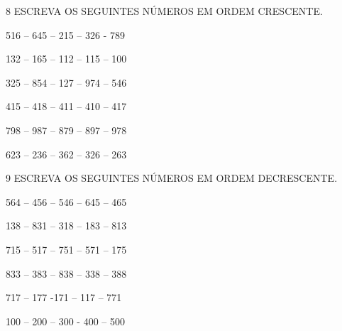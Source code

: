 
\num{8} ESCREVA OS SEGUINTES NÚMEROS EM ORDEM CRESCENTE.

\begin{escolha}
\item 516 -- 645 -- 215 -- 326 - 789



\item 132 -- 165 -- 112 -- 115 -- 100



\item 325 -- 854 -- 127 -- 974 -- 546



\item 415 -- 418 -- 411 -- 410 -- 417



\item 798 -- 987 -- 879 -- 897 -- 978



\item 623 -- 236 -- 362 -- 326 -- 263

\end{escolha}

\pagebreak
\num{9} ESCREVA OS SEGUINTES NÚMEROS EM ORDEM DECRESCENTE.

\begin{escolha}
\item 564 -- 456 -- 546 -- 645 -- 465


\item 138 -- 831 -- 318 -- 183 -- 813


\item 715 -- 517 -- 751 -- 571 -- 175


\item 833 -- 383 -- 838 -- 338 -- 388


\item 717 -- 177 -171 -- 117 -- 771


\item 100 -- 200 -- 300 - 400 -- 500

\end{escolha}

